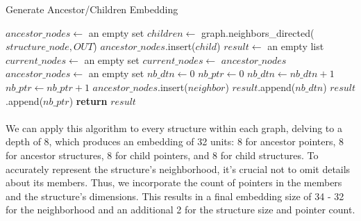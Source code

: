     \begin{algorithm}[H]
        \caption{Generate Ancestor/Children Embedding}
        \label{algo:embedding:generate_ancestor_children_embedding}
        \begin{algorithmic}
                \State $ancestor\_nodes \gets$ an empty set
                \State $children \gets$ graph.neighbors\_directed($structure\_node, OUT$) 
                    \State $ancestor\_nodes$.insert($child$)
                \EndFor
                \State $result \gets$ an empty list
                \State $current\_nodes \gets$ an empty set
                    \State $current\_nodes \gets$ $ancestor\_nodes$ 
                    \State $ancestor\_nodes \gets$ an empty set
                    \State $nb\_dtn \gets 0$
                    \State $nb\_ptr \gets 0$
                         
                            \State $nb\_dtn \gets nb\_dtn + 1$
                            \State $nb\_ptr \gets nb\_ptr + 1$
                        \EndIf
                            \State $ancestor\_nodes$.insert($neighbor$) 
                        \EndFor
                    \EndFor
                    \State $result$.append($nb\_dtn$) 
                    \State $result$.append($nb\_ptr$) 
                \EndFor
                \State \textbf{return} $result$
            \EndFunction
        \end{algorithmic}
     \end{algorithm}
     
     \paragraph{}We can apply this algorithm to every \gls{structure} within each graph, delving to a depth of 8, which produces an embedding of 32 units: 8 for ancestor \glspl{pointer}, 8 for ancestor \glspl{structure}, 8 for child \glspl{pointer}, and 8 for child \glspl{structure}. To accurately represent the \gls{structure}'s neighborhood, it's crucial not to omit details about its members. Thus, we incorporate the count of \glspl{pointer} in the members and the \gls{structure}'s dimensions. This results in a final embedding size of 34 - 32 for the neighborhood and an additional 2 for the \gls{structure} size and \gls{pointer} count.
     